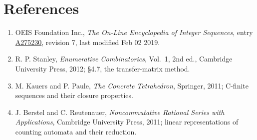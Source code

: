 \documentclass[11pt]{article}
\theoremstyle{definition}
\begin{document}
\section{References}

\begin{enumerate}

\item OEIS Foundation Inc., \emph{The On-Line Encyclopedia of Integer Sequences}, entry \href{https://oeis.org/A275230}{A275230}, revision 7, last modified Feb 02 2019.

\item R. P. Stanley, \emph{Enumerative Combinatorics}, Vol.~1, 2nd ed., Cambridge University Press, 2012; \S4.7, the transfer-matrix method.

\item M. Kauers and P. Paule, \emph{The Concrete Tetrahedron}, Springer, 2011; C-finite sequences and their closure properties.

\item J. Berstel and C. Reutenauer, \emph{Noncommutative Rational Series with Applications}, Cambridge University Press, 2011; linear representations of counting automata and their reduction.

\end{enumerate}
\end{document}
